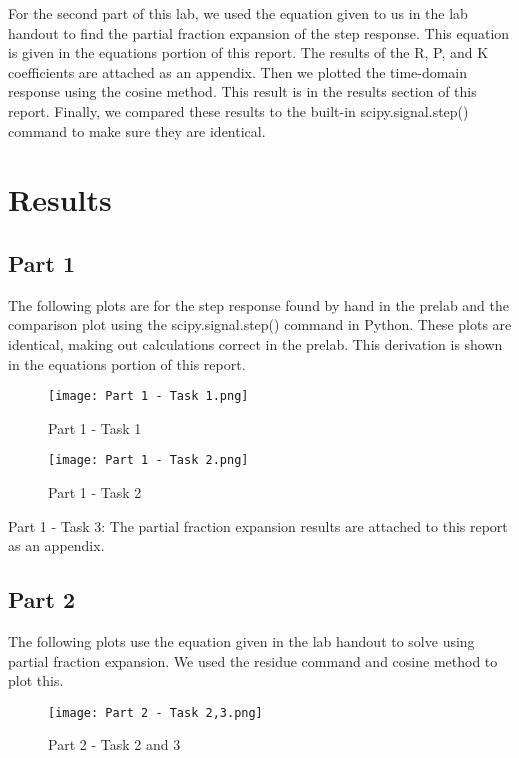\documentclass[12pt]{report}
\begin{document}
\noindent For the second part of this lab, we used the equation given to us in the lab handout to find the partial fraction expansion of the step response. This equation is given in the equations portion of this report. The results of the R, P, and K coefficients are attached as an appendix. Then we plotted the time-domain response using the cosine method. This result is in the results section of this report. Finally, we compared these results to the built-in scipy.signal.step() command to make sure they are identical. 

\section{Results}
\subsection{Part 1}
The following plots are for the step response found by hand in the prelab and the comparison plot using the scipy.signal.step() command in Python. These plots are identical, making out calculations correct in the prelab. This derivation is shown in the equations portion of this report. 

\begin{figure}[ht]
\begin{center}
\texttt{[image: Part 1 - Task 1.png]}
\caption{Part 1 - Task 1}
\end{center}
\end{figure}

\begin{figure}[ht]
\begin{center}
\texttt{[image: Part 1 - Task 2.png]}
\caption{Part 1 - Task 2}
\end{center}
\end{figure}

\noindent Part 1 - Task 3:
\noindent The partial fraction expansion results are attached to this report as an appendix. 
\newline 

\subsection{Part 2}
\noindent The following plots use the equation given in the lab handout to solve using partial fraction expansion. We used the residue command and cosine method to plot this. 

\begin{figure}[ht]
\begin{center}
\texttt{[image: Part 2 - Task 2,3.png]}
\caption{Part 2 - Task 2 and 3}
\end{center}
\end{figure}
\clearpage 
\end{document}
